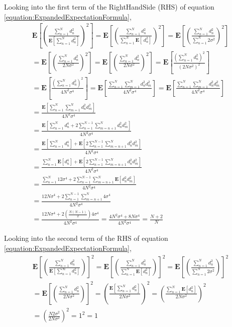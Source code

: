 \documentclass[a4paper,12pt]{article}
\begin{document}
Looking into the first term of the RightHandSide (RHS) of equation \ref{equation:ExpandedExpectationFormula},
\begin{equation}
\label{equation:CurseOfDimLHS}
\begin{split}
\mathbf{E}[(\frac{\sum_{n=1}^{N} d_{n}^{2}}{\mathbf{E}[\sum_{n=1}^{N} d_{n}^{2}]})^{2}]
= 
\mathbf{E}[(\frac{\sum_{n=1}^{N} d_{n}^{2}}{\sum_{n=1}^{N} \mathbf{E}[\ d_{n}^{2}]})^{2}]
=
\mathbf{E}[(\frac{\sum_{n=1}^{N} d_{n}^{2}}{\sum_{n=1}^{N} 2\sigma^{2}})^{2}] \\
=
\mathbf{E}[(\frac{\sum_{n=1}^{N} d_{n}^{2}}{2N\sigma^{2}})^{2}]
= 
\mathbf{E}[(\frac{\sum_{n=1}^{N} d_{n}^{2}}{2N\sigma^{2}})^{2}]
=
\mathbf{E}[\frac{(\sum_{n=1}^{N} d_{n}^{2})^{2}}{(2N\sigma^{2})^{2}}] \\
= 
\mathbf{E}[\frac{(\sum_{n=1}^{N} d_{n}^{2})^{2}}{4N^{2}\sigma^{4}}]
=
\mathbf{E}[\frac{\sum_{n=1}^{N}\sum_{m=1}^{N}d_{n}^{2}d_{m}^{2}}{4N^{2}\sigma^{4}}]
=
\mathbf{E}[\frac{\sum_{n=1}^{N}\sum_{m=1}^{N}d_{n}^{2}d_{m}^{2}}{4N^{2}\sigma^{4}}] \\
=
\frac{\mathbf{E}[\sum_{n=1}^{N}\sum_{m=1}^{N}d_{n}^{2}d_{m}^{2}]}{4N^{2}\sigma^{4}} \\
= 
\frac{\mathbf{E}[\sum_{n=1}^{N}d_{n}^{4} + 2\sum_{n=1}^{N-1}\sum_{m=n+1}^{N}d_{n}^{2}d_{m}^{2}]}{4N^{2}\sigma^{4}} \\
=
\frac{\mathbf{E}[\sum_{n=1}^{N}d_{n}^{4}] + \mathbf{E}[2\sum_{n=1}^{N-1}\sum_{m=n+1}^{N}d_{n}^{2}d_{m}^{2}]}{4N^{2}\sigma^{4}} \\
=
\frac{\sum_{n=1}^{N}\mathbf{E}[d_{n}^{4}] + \mathbf{E}[2\sum_{n=1}^{N-1}\sum_{m=n+1}^{N}d_{n}^{2}d_{m}^{2}]}{4N^{2}\sigma^{4}} \\
= 
\frac{\sum_{n=1}^{N}12\sigma^{4} + 2\sum_{n=1}^{N-1}\sum_{m=n+1}^{N}\mathbf{E}[d_{n}^{2}d_{m}^{2}]}{4N^{2}\sigma^{4}} \\
=
\frac{12N\sigma^{4} + 2\sum_{n=1}^{N-1}\sum_{m=n+1}^{N} 4\sigma^{4}}{4N^{2}\sigma^{4}} \\
=
\frac{12N\sigma^{4} + 2(\frac{N(N-1)}{2}) 4\sigma^{4}}{4N^{2}\sigma^{4}} 
= \frac{4N^{2}\sigma^{4} + 8N\sigma^{4}}{4N^{2}\sigma^{4}} = \frac{N + 2}{N}
\end{split}
\end{equation} 

Looking into the second term of the RHS of equation \ref{equation:ExpandedExpectationFormula},
\begin{equation}
\label{equation:CurseOfDimRHS}
\begin{split}
\mathbf{E}[(\frac{\sum_{n=1}^{N} d_{n}^{2}}{\mathbf{E}[\sum_{n=1}^{\infty} d_{n}^{2}]})]^{2} 
= 
\mathbf{E}[(\frac{\sum_{n=1}^{N} d_{n}^{2}}{\sum_{n=1}^{N} \mathbf{E}[d_{n}^{2}]})]^{2} 
=
\mathbf{E}[(\frac{\sum_{n=1}^{N} d_{n}^{2}}{\sum_{n=1}^{N} 2\sigma^{2}})]^{2} \\
= 
\mathbf{E}[(\frac{\sum_{n=1}^{N} d_{n}^{2}}{2N\sigma^{2}})]^{2} 
= 
(\frac{\mathbf{E}[\sum_{n=1}^{N} d_{n}^{2}]}{2N\sigma^{2}})^{2} 
=
(\frac{\sum_{n=1}^{N} \mathbf{E}[ d_{n}^{2}]}{2N\sigma^{2}})^{2} \\
=
(\frac{N2\sigma^{2}}{2N\sigma^{2}})^{2} = 1^{2} = 1
\end{split}
\end{equation} 
\end{document}
